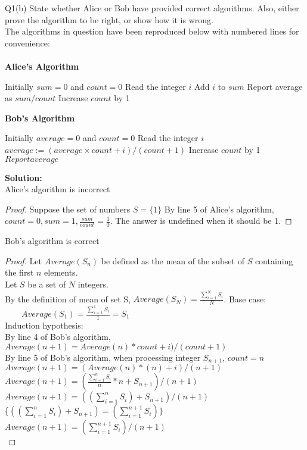 \begin{problem}
  {Q1(b)}
  State whether Alice or Bob have provided correct algorithms.
  Also, either prove the algorithm to be right, or show how it is wrong.\\
  The algorithms in question have been reproduced below with numbered lines for convenience: \\
  \vspace{10pt}\\
  \textbf{Alice's Algorithm}
  \begin{algorithmic}[1]
    \STATE Initially $sum = 0$ and $count = 0$
    \STATE Read the integer $i$
    \STATE Add $i$ to $sum$
    \STATE Report average as $sum / count$
    \STATE Increase $count$ by 1
    \ENDWHILE
  \end{algorithmic}
  \vspace{10pt}
  \textbf{Bob's Algorithm}
  \begin{algorithmic}[1]
    \STATE Initially $average = 0$ and $count = 0$
    \STATE Read the integer $i$
    \STATE $average := (average \times count + i) / (count + 1)$
    \STATE Increase $count$ by 1
    \STATE $Report average$
    \ENDWHILE
  \end{algorithmic}
  \textbf{Solution:}\\
  \noindent
  Alice's algorithm is incorrect
  \begin{proof}
      Suppose the set of numbers $S=\{1\}$
      By line 5 of Alice's algorithm, $count=0,sum=1,\frac{sum}{count} = \frac{1}{0}$. The answer is undefined when it should be 1.
  \end{proof}
  \noindent
  Bob's algorithm is correct
  \begin{proof}
      Let $Average(S_n)$ be defined as the mean of the subset of $S$ containing the first $n$ elements. \\
      Let $S$ be a set of $N$ integers. \\
      By the definition of mean of set S, $Average(S_N) = \frac{\sum_{i=1}^{N} S_i}{N}$.
      Base case: \\
      ~~~~$Average(S_1) = \frac{\sum_{i=1}^{1} S_i}{1} = S_1$ \\
      Induction hypothesis: \\
      By line 4 of Bob's algorithm, $Average(n+1) = Average(n) * count + i) / (count + 1)$ \\
      By line 5 of Bob's algorithm, when processing integer $S_{n+1}$, $count = n$ \\
      $Average(n+1) = (Average(n) * (n) + i) / (n+1)$ \\
      $Average(n+1) = (\frac{\sum_{i = 1}^{n} S_i}{n} * n + S_{n+1}) / (n+1)$ \\
      $Average(n+1) = ((\sum_{i = 1}^{n} S_i) + S_{n+1}) / (n + 1)$ \\
      \{$((\sum_{i = 1}^{n} S_i) + S_{n+1}) = (\sum_{i = 1}^{n+1} S_i)\}$ \\
      $Average(n+1) = (\sum_{i = 1}^{n+1} S_i) / (n + 1) $ \\
  \end{proof}
\end{problem}
